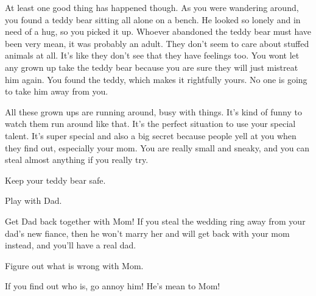 \documentclass[char]{guildcamp1}
\begin{document}
At least one good thing has happened though. As you were wandering around, you found a teddy bear sitting all alone on a bench.  He looked so lonely and in need of a hug, so you picked it up. Whoever abandoned the teddy bear must have been very mean, it was probably an adult. They don't seem to care about stuffed animals at all. It's like they don't see that they have feelings too. You wont let any grown up take the teddy bear because you are sure they will just mistreat him again. You found the teddy, which makes it rightfully yours. No one is going to take him away from you.

All these grown ups are running around, busy with things. It's kind of funny to watch them run around like that. It's the perfect situation to use your special talent. It's super special and also a big secret because people yell at you when they find out, especially your mom. You are really small and sneaky, and you can steal almost anything if you really try. 






\begin{itemz}[Goals]
  \item Keep your teddy bear safe.
  \item Play with Dad.
  \item Get Dad back together with Mom! If you steal the wedding ring away from your dad's new fiance, then he won't marry her and will get back with your mom instead, and you'll have a real dad.
  \item Figure out what is wrong with Mom.
  \item If you find out who \cRival{} is, go annoy him! He's mean to Mom!
\end{itemz}


\begin{contacts}
  \contact{\cScientist{}} Your mom. You love her so much!
  \contact{\cGroomA{\MYname}} Your dad. You've never met him but you love him too!
  \contact{\cRival{} Your mom doesn't like him! They're \emph{ENEMIES.}
\end{contacts}
\end{document}
